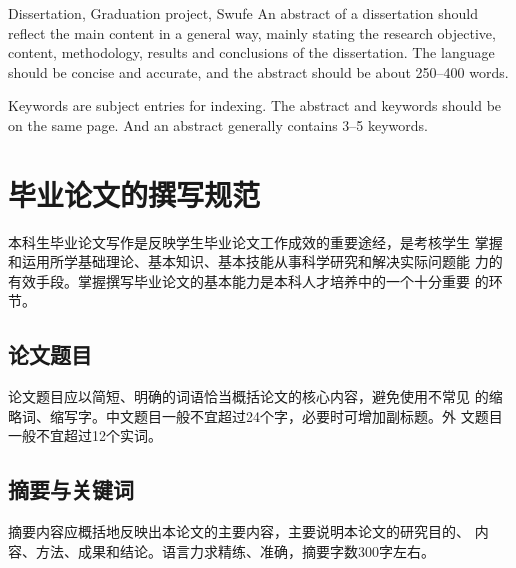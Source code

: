 \documentclass{swufethesis}
\begin{document}
\maketitle %
\statement %

\begin{abstract}{毕业论文, 毕业设计, 西南财经大学}
  摘要内容应概括地反映出本论文的主要内容，主要说明本论文的研究目的、
  内容、方法、成果和结论。语言力求精练、准确，摘要字数300字左右。

  关键词是供检索用的主题词条。摘要与关键词应在同一页。关键词一般3--5个。
\end{abstract}

\begin{abstract*}{Dissertation, Graduation project, Swufe}
  An abstract of a dissertation should reflect the main content in a general way,
  mainly stating the research objective, content, methodology, results and conclusions
  of the dissertation. The language should be concise and accurate, and the abstract
  should be about 250--400 words.

  Keywords are subject entries for indexing. The abstract and keywords should be
  on the same page. And an abstract generally contains 3--5 keywords.
\end{abstract*}

\tableofcontents

\mainmatter %
\chapter{毕业论文的撰写规范}
本科生毕业论文写作是反映学生毕业论文工作成效的重要途经，是考核学生
掌握和运用所学基础理论、基本知识、基本技能从事科学研究和解决实际问题能
力的有效手段。掌握撰写毕业论文的基本能力是本科人才培养中的一个十分重要
的环节。
\section{论文题目}
论文题目应以简短、明确的词语恰当概括论文的核心内容，避免使用不常见
的缩略词、缩写字。中文题目一般不宜超过24个字，必要时可增加副标题。外
文题目一般不宜超过12个实词。

\section{摘要与关键词}
摘要内容应概括地反映出本论文的主要内容，主要说明本论文的研究目的、
内容、方法、成果和结论。语言力求精练、准确，摘要字数300字左右。
\end{document}
